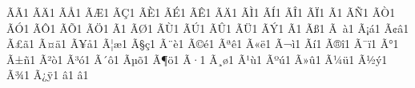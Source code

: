 {        {^^c3^^83}{{\~{A}}}1  %
        {^^c3^^84}{{\"{A}}}1  %
        {^^c3^^85}{{\AA}}1  %
        {^^c3^^86}{{\AE}}1  %
        {^^c3^^87}{{\c{C}}}1  %
        {^^c3^^88}{{\`{E}}}1  %
        {^^c3^^89}{{\'{E}}}1  %
        {^^c3^^8a}{{\^{E}}}1  %
        {^^c3^^8b}{{\"{A}}}1  %
        {^^c3^^8c}{{\`{I}}}1  %
        {^^c3^^8d}{{\'{I}}}1  %
        {^^c3^^8e}{{\^{I}}}1  %
        {^^c3^^8f}{{\"{I}}}1  %
        {^^c3^^90}{{\DH}}1  %
        {^^c3^^91}{{\~{N}}}1  %
        {^^c3^^92}{{\`{O}}}1  %
        {^^c3^^93}{{\'{O}}}1  %
        {^^c3^^94}{{\^{O}}}1  %
        {^^c3^^95}{{\~{O}}}1  %
        {^^c3^^96}{{\"{O}}}1  %
        {^^c3^^97}{{\texttimes}}1  %
        {^^c3^^98}{{\O}}1  %
        {^^c3^^99}{{\`{U}}}1  %
        {^^c3^^9a}{{\'{U}}}1  %
        {^^c3^^9b}{{\^{U}}}1  %
        {^^c3^^9c}{{\"{U}}}1  %
        {^^c3^^9d}{{\'{Y}}}1  %
        {^^c3^^9e}{{\TH}}1  %
        {^^c3^^9f}{{\ss}}1  %
        {^^c3^^a0}{{\`{a}}}1  %
        {^^c3^^a1}{{\'{a}}}1  %
        {^^c3^^a2}{{\^{a}}}1  %
        {^^c3^^a3}{{\~{a}}}1  %
        {^^c3^^a4}{{\"{a}}}1  %
        {^^c3^^a5}{{\aa}}1  %
        {^^c3^^a6}{{\ae}}1  %
        {^^c3^^a7}{{\c{c}}}1  %
        {^^c3^^a8}{{\`{e}}}1  %
        {^^c3^^a9}{{\'{e}}}1  %
        {^^c3^^aa}{{\^{e}}}1  %
        {^^c3^^ab}{{\"{e}}}1  %
        {^^c3^^ac}{{\`{i}}}1  %
        {^^c3^^ad}{{\'{i}}}1  %
        {^^c3^^ae}{{\^{i}}}1  %
        {^^c3^^af}{{\"{i}}}1  %
        {^^c3^^b0}{{\DH}}1  %
        {^^c3^^b1}{{\~{n}}}1  %
        {^^c3^^b2}{{\`{o}}}1  %
        {^^c3^^b3}{{\'{o}}}1  %
        {^^c3^^b4}{{\^{o}}}1  %
        {^^c3^^b5}{{\~{o}}}1  %
        {^^c3^^b6}{{\"{o}}}1  %
        {^^c3^^b7}{{\textdiv}}1  %
        {^^c3^^b8}{{\o}}1  %
        {^^c3^^b9}{{\`{u}}}1  %
        {^^c3^^ba}{{\'{u}}}1  %
        {^^c3^^bb}{{\^{u}}}1  %
        {^^c3^^bc}{{\"{u}}}1  %
        {^^c3^^bd}{{\'{y}}}1  %
        {^^c3^^be}{{\th}}1  %
        {^^c3^^bf}{{\"{y}}}1  %
        {^^e2^^80^^90}{{\texthyphen}}1  %
        {^^e2^^80^^91}{{\textnonbreakingdash}}1  %
}
